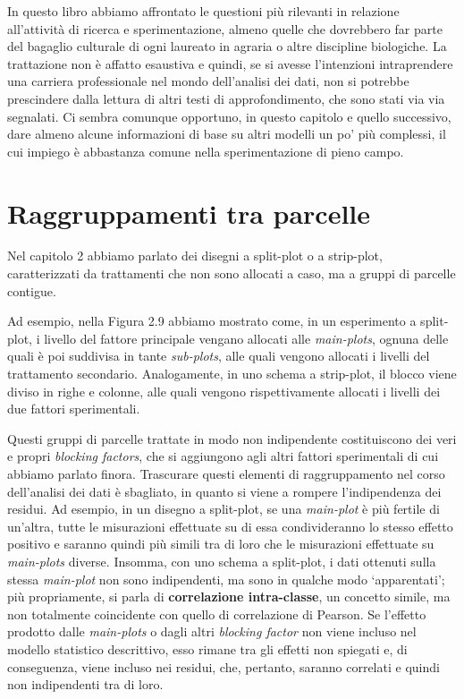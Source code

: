\documentclass[a4paper,12pt,oneside]{book}
\begin{document}
In questo libro abbiamo affrontato le questioni più rilevanti in relazione all'attività di ricerca e sperimentazione, almeno quelle che dovrebbero far parte del bagaglio culturale di ogni laureato in agraria o altre discipline biologiche. La trattazione non è affatto esaustiva e quindi, se si avesse l'intenzioni intraprendere una carriera professionale nel mondo dell'analisi dei dati, non si potrebbe prescindere dalla lettura di altri testi di approfondimento, che sono stati via via segnalati. Ci sembra comunque opportuno, in questo capitolo e quello successivo, dare almeno alcune informazioni di base su altri modelli un po' più complessi, il cui impiego è abbastanza comune nella sperimentazione di pieno campo.

\hypertarget{raggruppamenti-tra-parcelle}{%
\section{Raggruppamenti tra parcelle}\label{raggruppamenti-tra-parcelle}}

Nel capitolo 2 abbiamo parlato dei disegni a split-plot o a strip-plot, caratterizzati da trattamenti che non sono allocati a caso, ma a gruppi di parcelle contigue.

Ad esempio, nella Figura 2.9 abbiamo mostrato come, in un esperimento a split-plot, i livello del fattore principale vengano allocati alle \emph{main-plots}, ognuna delle quali è poi suddivisa in tante \emph{sub-plots}, alle quali vengono allocati i livelli del trattamento secondario. Analogamente, in uno schema a strip-plot, il blocco viene diviso in righe e colonne, alle quali vengono rispettivamente allocati i livelli dei due fattori sperimentali.

Questi gruppi di parcelle trattate in modo non indipendente costituiscono dei veri e propri \emph{blocking factors}, che si aggiungono agli altri fattori sperimentali di cui abbiamo parlato finora. Trascurare questi elementi di raggruppamento nel corso dell'analisi dei dati è sbagliato, in quanto si viene a rompere l'indipendenza dei residui. Ad esempio, in un disegno a split-plot, se una \emph{main-plot} è più fertile di un'altra, tutte le misurazioni effettuate su di essa condivideranno lo stesso effetto positivo e saranno quindi più simili tra di loro che le misurazioni effettuate su \emph{main-plots} diverse. Insomma, con uno schema a split-plot, i dati ottenuti sulla stessa \emph{main-plot} non sono indipendenti, ma sono in qualche modo `apparentati'; più propriamente, si parla di \textbf{correlazione intra-classe}, un concetto simile, ma non totalmente coincidente con quello di correlazione di Pearson. Se l'effetto prodotto dalle \emph{main-plots} o dagli altri \emph{blocking factor} non viene incluso nel modello statistico descrittivo, esso rimane tra gli effetti non spiegati e, di conseguenza, viene incluso nei residui, che, pertanto, saranno correlati e quindi non indipendenti tra di loro.
\end{document}
